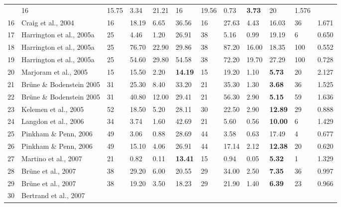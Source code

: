 \documentclass[a4paper, 12pt, twoside]{article}
\begin{document}
\begin{landscape}
\begin{longtable}[l]{cL{4cm} R{1.5cm}  R{1.5cm} R{1.5cm}R{1.5cm}  R{1.5cm}  R{1.5cm} R{1.5cm}R{1.5cm} R{1.5cm}R{1.5cm}}
		& 16 & 15.75 & 3.34 & 21.21 & 16 & 19.56 & 0.73 & \textbf{3.73} & 20 & 1.576\\     
		16 & Craig et al., 2004 
		& 16 & 18.19 & 6.65 & 36.56 & 16 & 27.63 & 4.43 & 16.03 & 36 & 1.671 \\     
		17 & Harrington et al., 2005a 
		& 25 & 4.46 & 1.20 & 26.91 & 38 & 5.16 & 0.99 & 19.19 & 6 & 0.650\\  
		18 & Harrington et al., 2005a 
		& 25 & 76.70 & 22.90 & 29.86 & 38 & 87.20 & 16.00 & 18.35 & 100 & 0.552 \\ 
		19 & Harrington et al., 2005a 
		& 25 & 54.60 & 29.80 & 54.58 & 38 & 72.20 & 19.70 & 27.29 & 100 & 0.728\\
		20 & Marjoram et al., 2005 
		& 15 & 15.50 & 2.20 & \textbf{14.19} & 15 & 19.20 & 1.10 & \textbf{5.73} & 20 &2.127\\       
		21 & Br{\"u}ne \& Bodenstein 2005 
		& 31 & 25.30 & 8.40 & 33.20 & 21 & 35.30 & 1.30 & \textbf{3.68} & 36 & 1.525\\    
		22 & Br{\"u}ne \& Bodenstein 2005 
		& 31 & 40.80 & 12.00 & 29.41 & 21 & 56.30 & 2.90 & \textbf{5.15} & 59 & 1.636 \\    
		23 & Kelemen et al., 2005 
		& 52 & 18.50 & 5.20 & 28.11 & 30 & 22.50 & 2.90 & \textbf{12.89} & 29 & 0.888 \\    
		24 & Langdon et al., 2006 
		& 34 & 3.74 & 1.60 & 42.69 & 21 & 5.60 & 0.56 & \textbf{10.00} & 6 & 1.429\\     
		25 & Pinkham \& Penn, 2006 
		& 49 & 3.06 & 0.88 & 28.69 & 44 & 3.58 & 0.63 & 17.49 & 4 & 0.677 \\     
		26 & Pinkham \& Penn, 2006 
		& 49 & 15.10 & 4.06 & 26.91 & 44 & 17.14 & 2.12 & \textbf{12.38} & 20 & 0.620\\
		27 & Martino et al., 2007 
		& 21 & 0.82 & 0.11 & \textbf{13.41} & 15 & 0.94 & 0.05 & \textbf{5.32} & 1 & 1.329\\     
		28 & Br{\"u}ne et al., 2007 
		& 38 & 29.20 & 6.00 & 20.55 & 29 & 34.00 & 2.50 & \textbf{7.35} & 36 & 0.997\\                
		29 & Br{\"u}ne et al., 2007
		& 38 & 19.20 & 3.50 & 18.23 & 29 & 21.90 & 1.40 & \textbf{6.39} & 23 & 0.966\\       
		30 & Bertrand et al., 2007 

\end{longtable}
\end{landscape}
\end{document}
